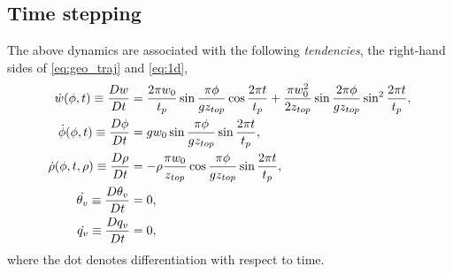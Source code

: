 \subsection{Time stepping}

The above dynamics are associated with the following \emph{tendencies}, the right-hand sides of \eqref{eq:geo_traj} and \eqref{eq:1d},
\begin{subequations}\label{eq:tends}
  \begin{align}
     \dot{w}(\phi,t) \equiv \frac{D w}{Dt}  &= \frac{2\pi w_0}{t_p}\sin\frac{\pi\phi}{gz_{top}}\cos\frac{2\pi t}{t_p} + \frac{\pi w_0^2}{2z_{top}}\sin\frac{2\pi\phi}{gz_{top}}\sin^2\frac{2\pi t}{t_p},\\
    \dot{\phi}(\phi,t) \equiv \frac{D \phi}{Dt} &= gw_0 \sin \frac{\pi \phi}{g z_{top}}\sin\frac{2\pi t}{t_p},\\
    \dot{\rho}(\phi, t, \rho) \equiv \frac{D \rho}{Dt} &= -\rho \frac{\pi w_0}{z_{top}}\cos\frac{\pi \phi}{g z_{top}}\sin\frac{2\pi t}{t_p},\\
    \dot{\theta_v} \equiv \frac{D \theta_v}{Dt} &= 0,\\
    \dot{q_v} \equiv \frac{D q_v}{Dt} &= 0,
  \end{align}
\end{subequations} 
where the dot denotes differentiation with respect to time.


